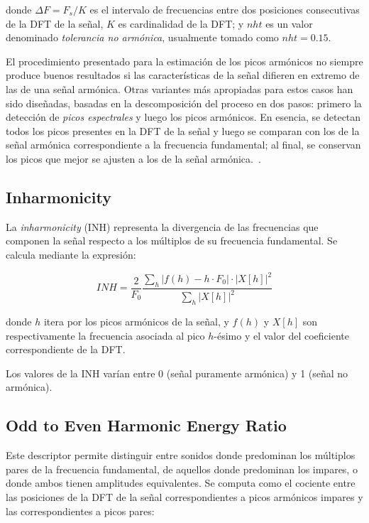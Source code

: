 \noindent
donde $\Delta F = F_{s}/K$ es el intervalo de frecuencias entre dos posiciones consecutivas de la DFT de la señal, $K$ es cardinalidad de la DFT;
y $nht$ es un valor denominado \textit{tolerancia no armónica}, usualmente tomado como $nht = 0.15$.

El procedimiento presentado para la estimación de los picos armónicos no siempre produce buenos resultados si las características de la señal difieren en extremo de las de una señal armónica.
Otras variantes más apropiadas para estos casos han sido diseñadas, basadas en la descomposición del proceso en dos pasos: primero la detección de \textit{picos espectrales} y luego los picos armónicos.
En esencia, se detectan todos los picos presentes en la DFT de la señal y luego se comparan con los de la señal armónica correspondiente a la frecuencia fundamental;
al final, se conservan los picos que mejor se ajusten a los de la señal armónica.~\cite{Kim05}.

\subsection{Inharmonicity}\label{subsec:inharmonicity}

La \textit{inharmonicity} (INH) representa la divergencia de las frecuencias que componen la señal respecto a los múltiplos de su frecuencia fundamental.
Se calcula mediante la expresión:

\begin{equation}
    \label{eq:INH}
    INH = \frac{2}{F_0} \frac{\sum_{h}{|f(h) - h\cdot F_0|\cdot |X[h]|^2}}{\sum_{h}{|X[h]|^2}}
\end{equation}

\noindent
donde $h$ itera por los picos armónicos de la señal, y $f(h)$ y $X[h]$ son respectivamente la frecuencia asociada al pico $h$-ésimo y el valor del coeficiente correspondiente de la DFT\@.

Los valores de la INH varían entre 0 (señal puramente armónica) y 1 (señal no armónica).

\subsection{Odd to Even Harmonic Energy Ratio}\label{subsec:oddToEvenHarmonicEnergyRatio}

Este descriptor permite distinguir entre sonidos donde predominan los múltiplos pares de la frecuencia fundamental, de aquellos donde predominan los impares, o donde ambos tienen amplitudes equivalentes.
Se computa como el cociente entre las posiciones de la DFT de la señal correspondientes a picos armónicos impares y las correspondientes a picos pares:

